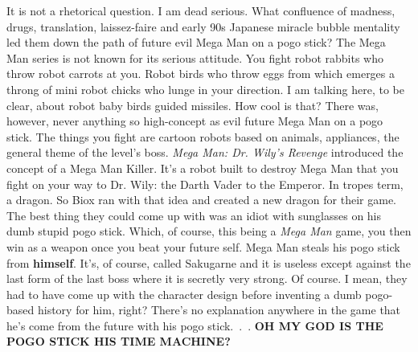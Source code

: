 \documentclass{book}
\begin{document}
It is not a rhetorical question. I am dead serious. What confluence of madness, drugs, translation, laissez-faire and early 90s Japanese miracle bubble mentality led them down the path of future evil Mega Man on a pogo stick? The Mega Man series is not known for its serious attitude. You fight robot rabbits who throw robot carrots at you. Robot birds who throw eggs from which emerges a throng of mini robot chicks who lunge in your direction. I am talking here, to be clear, about robot baby birds guided missiles. How cool is that? There was, however, never anything so high-concept as evil future Mega Man on a pogo stick. The things you fight are cartoon robots based on animals, appliances, the general theme of the level’s boss. \emph{Mega Man: Dr. Wily’s Revenge} introduced the concept of a Mega Man Killer. It’s a robot built to destroy Mega Man that you fight on your way to Dr. Wily: the Darth Vader to the Emperor. In tropes term, a dragon. So Biox ran with that idea and created a new dragon for their game. The best thing they could come up with was an idiot with sunglasses on his dumb stupid pogo stick. Which, of course, this being a \emph{Mega Man} game, you then win as a weapon once you beat your future self. Mega Man steals his pogo stick from \textbf{himself}. It’s, of course, called Sakugarne and it is useless except against the last form of the last boss where it is secretly very strong. Of course. I mean, they had to have come up with the character design before inventing a dumb pogo-based history for him, right? There’s no explanation anywhere in the game that he’s come from the future with his pogo stick.~.~. \textbf{OH MY GOD IS THE POGO STICK HIS TIME MACHINE?}\par
\FloatBarrier\vspace{\baselineskip}\centering
\begin{minipage}{0.45\linewidth}\end{minipage}\vspace{2pt}
\begin{minipage}{0.45\linewidth}\end{minipage}\vspace{2pt}
\begin{minipage}{0.45\linewidth}\end{minipage}
\par\justifying
\end{document}
